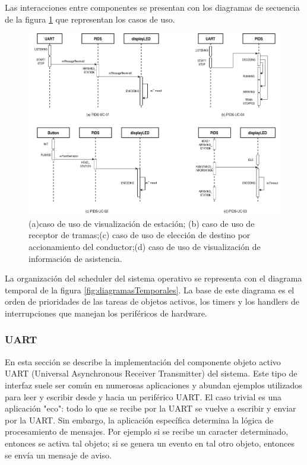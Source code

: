 Las interacciones entre componentes se presentan con los diagramas de secuencia de la figura \ref{fig:diagramaSecuenciaSistema} que representan los casos de uso.

\begin{figure}[ht]
	\centering
	\includegraphics[width=1\textwidth]{../Figures/secuenciasSistema.png}
	\caption{(a)caso de uso de visualización de estación; (b) caso de uso de receptor de tramas;(c) caso de uso de elección de destino por accionamiento del conductor;(d) caso de uso de visualización de información de asistencia.}
	\label{fig:diagramaSecuenciaSistema}
\end{figure}


La organización del scheduler del sistema operativo se representa con el diagrama temporal de la figura \ref{fig:diagramasTemporales}. La base de este diagrama es el orden de prioridades de las tareas de objetos activos, los timers y los handlers de interrupciones que manejan los periféricos de hardware.\\

\subsubsection{UART}

En esta sección se describe la implementación del componente objeto activo UART (Universal Asynchronous Receiver Transmitter) del sistema. Este tipo de interfaz suele ser común en numerosas aplicaciones y abundan ejemplos utilizados para leer y escribir desde y hacia un periférico UART. El caso trivial es una aplicación "eco": todo lo que se recibe por la UART se vuelve a escribir y enviar por la UART. Sin embargo, la aplicación específica determina la lógica de procesamiento de mensajes. Por ejemplo si se recibe un caracter determinado, entonces se activa tal objeto; si se genera un evento en tal otro objeto, entonces se envía un mensaje de aviso. \\

